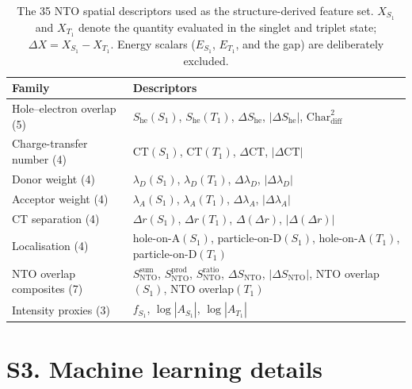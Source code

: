 \documentclass[final,3p,times,twocolumn]{elsarticle}
\begin{document}
\begin{table}[htbp]
  \centering
  \caption{The \num{35} NTO spatial descriptors used as the structure-derived
    feature set. $X_{S_1}$ and $X_{T_1}$ denote the quantity evaluated in the
    singlet and triplet state; $\Delta X = X_{S_1}-X_{T_1}$. Energy scalars
    ($E_{S_1}$, $E_{T_1}$, and the gap) are deliberately excluded.}
  \label{tab:descriptors}
  \footnotesize
  \begin{tabular}{p{}p{}}
    \toprule
    Family & Descriptors \\
    \midrule
    Hole--electron overlap (5)
      & $S_\text{he}(S_1)$, $S_\text{he}(T_1)$, $\Delta S_\text{he}$,
        $|\Delta S_\text{he}|$, $\text{Char}_\text{diff}^2$ \\
    \addlinespace
    Charge-transfer number (4)
      & $\text{CT}(S_1)$, $\text{CT}(T_1)$, $\Delta\text{CT}$, $|\Delta\text{CT}|$ \\
    \addlinespace
    Donor weight (4)
      & $\lambda_D(S_1)$, $\lambda_D(T_1)$, $\Delta\lambda_D$, $|\Delta\lambda_D|$ \\
    \addlinespace
    Acceptor weight (4)
      & $\lambda_A(S_1)$, $\lambda_A(T_1)$, $\Delta\lambda_A$, $|\Delta\lambda_A|$ \\
    \addlinespace
    CT separation (4)
      & $\Delta r(S_1)$, $\Delta r(T_1)$, $\Delta(\Delta r)$, $|\Delta(\Delta r)|$ \\
    \addlinespace
    Localisation (4)
      & hole-on-A$(S_1)$, particle-on-D$(S_1)$,
        hole-on-A$(T_1)$, particle-on-D$(T_1)$ \\
    \addlinespace
    NTO overlap composites (7)
      & $S_\text{NTO}^{\text{sum}}$, $S_\text{NTO}^{\text{prod}}$,
        $S_\text{NTO}^{\text{ratio}}$, $\Delta S_\text{NTO}$,
        $|\Delta S_\text{NTO}|$, NTO overlap$(S_1)$, NTO overlap$(T_1)$ \\
    \addlinespace
    Intensity proxies (3)
      & $f_{S_1}$, $\log|A_{S_1}|$, $\log|A_{T_1}|$ \\
    \bottomrule
  \end{tabular}
\end{table}

\section*{S3. Machine learning details}
\end{document}
